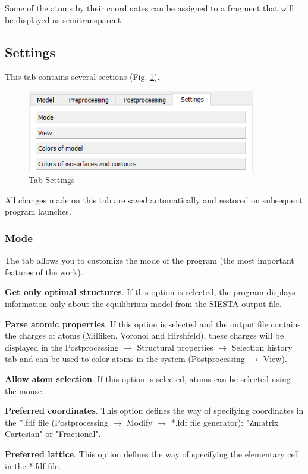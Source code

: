 \documentclass{article}
\begin{document}
Some of the atoms by their coordinates can be assigned to a fragment that will be displayed as semitransparent.


\subsection{Settings}

This tab contains several sections (Fig. \ref{fig:settings}).

\begin{figure}[h!]
	\centering
	\includegraphics[width=10.0cm]{settings}
	\caption{Tab Settings}
	\label{fig:settings}
\end{figure}

All changes made on this tab are saved automatically and restored on subsequent program launches.

\subsubsection{Mode \label{settingsmode} }

The tab allows you to customize the mode of the program (the most important features of the work).

\textbf{Get only optimal structures}. If this option is selected, the program displays information only about the equilibrium model from the SIESTA output file.


\textbf{Parse atomic properties}. If this option is selected and the output file contains the charges of atoms (Milliken, Voronoi and Hirshfeld), these charges will be displayed in the Postprocessing $\to$ Structural properties $\to$ Selection history tab and can be used to color atoms in the system (Postprocessing $\to$ View).


\textbf{Allow atom selection}. If this option is selected, atoms can be selected using the mouse.


\textbf{Preferred coordinates}. This option defines the way of specifying coordinates in the *.fdf file (Postprocessing $\to$ Modify $\to$ *.fdf file generator): "Zmatrix Cartesian" or "Fractional".


\textbf{Preferred lattice}. This option defines the way of specifying the elementary cell in the *.fdf file.
\end{document}

